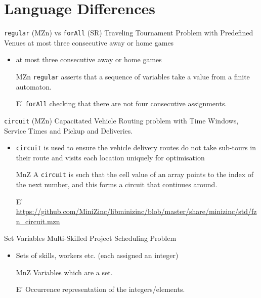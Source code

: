 \documentclass{beamer}
\begin{document}
\section*{Language Differences}
\begin{frame}{\texttt{regular} (MZn) vs \texttt{forAll} (SR)}
Traveling Tournament Problem with Predefined Venues at most three consecutive away or home games
\begin{itemize}
    \item at most three consecutive away or home games
    \item[MZn] \texttt{regular} asserts that a sequence of variables take a value from a finite automaton.
    \item[E'] \texttt{forAll} checking that there are not four consecutive assignments.
\end{itemize}
\end{frame}

\begin{frame}{\texttt{circuit} (MZn)}
Capacitated Vehicle Routing problem with Time Windows, Service Times and Pickup and Deliveries.
\begin{itemize}
    \item \texttt{circuit} is used to ensure the vehicle delivery routes do not take sub-tours in their route and visits each location uniquely for optimisation
    \item[MnZ] A \texttt{circuit} is such that the cell value of an array points to the index of the next number, and this forms a circuit that continues around. 
    \item[E'] \url{https://github.com/MiniZinc/libminizinc/blob/master/share/minizinc/std/fzn_circuit.mzn}
\end{itemize}
\end{frame}


\begin{frame}{Set Variables}
    Multi-Skilled Project Scheduling Problem
    \begin{itemize}
        \item Sets of skills, workers etc. (each assigned an integer)
        \item[MnZ] Variables which are a set.
        \item[E'] Occurrence representation of the integers/elements.
    \end{itemize} 
\end{frame}
\end{document}
